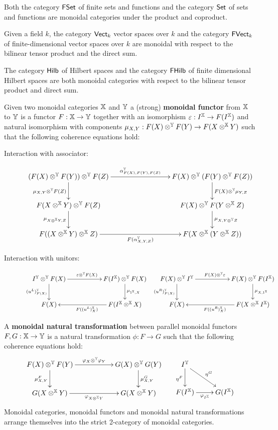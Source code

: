 \begin{example}
Both the category $\mathsf{FSet}$ of finite sets and functions and the category $\mathsf{Set}$ of sets and functions are monoidal categories under the product and coproduct.

Given a field $k$, the category $\mathsf{Vect}_k$ vector spaces over $k$  and the category $\mathsf{FVect}_k$ of finite-dimensional vector spaces over $k$ are monoidal with respect to the bilinear tensor product and the direct sum.

The category $\mathsf{Hilb}$ of Hilbert spaces and the category $\mathsf{FHilb}$ of finite dimensional Hilbert spaces are both monoidal categories with respect to the bilinear tensor product and direct sum.
\end{example}
\begin{definition}
Given two monoidal categories $\mathbb{X}$ and $\mathbb{Y}$ a (strong) {\bf monoidal functor} from $\mathbb{X}$ to $\mathbb{Y}$ is a functor $F:\mathbb{X}\to \mathbb{Y}$ together with an isomorphism $\varepsilon:I^{\mathbb{X}} \to F(I^{\mathbb{X}})$ and natural isomorphism with components $\mu_{X,Y}:F(X)\otimes^{\mathbb{Y}} F(Y) \to F(X \otimes^{\mathbb{X}} Y)$ such that the following coherence equations hold:
\begin{description}
\item[Interaction with associator:]
$$
\xymatrix{
 (F(X)\otimes^\Y F(Y))\otimes^\Y F(Z) \ar[rrr]^{\alpha_{F(X),F(Y),F(Z)}^{\Y}} \ar[d]_{\mu_{X,Y}\otimes^\Y F(Z)}
   &&& F(X) \otimes^\Y (F(Y)\otimes^\Y F(Z)) \ar[d]^{F(X)\otimes^\Y \mu_{Y,Z}}
 \\F(X\otimes^\X Y)\otimes^\Y F(Z) \ar[d]_{\mu_{X\otimes^\X Y,Z}}
   &&& F(X)\otimes^\Y F(Y\otimes^\X Z) \ar[d]^{\mu_{X,Y\otimes^\Y Z}}
 \\ F((X\otimes^\X Y) \otimes^\X Z) \ar[rrr]_{F(\alpha_{X,Y,Z}^\Y)}
   &&& F(X\otimes^\X (Y\otimes^\X Z))
}
$$
\item[Interaction with unitors:]
$$
\xymatrix{
 I^\Y \otimes^\Y F(X) \ar[rr]^{\epsilon \otimes^\Y F(X)} \ar[d]_{(u^L)^\Y_{F(X)}}
  &&  F(I^\X) \otimes^\Y F(X) \ar[d]^{\mu_{1^\X,X}}
\\F(X)
 & & F(I^\X\otimes^\X X) \ar[ll]^{F((u^L)^\X_{X} )}
} \hspace*{.2cm}
\xymatrix{
  F(X)  \otimes^\Y I^\Y \ar[rr]^{ F(X)  \otimes^\Y \epsilon} \ar[d]_{(u^R)^\Y_{F(X)}}
  && F(X) \otimes^\Y    F(I^\X)  \ar[d]^{\mu_{X,1^\X}}
\\F(X)
 & & F(X \otimes^\X I^\X ) \ar[ll]^{F((u^R)^\X_{X} )}
}
$$
\end{description}
A {\bf monoidal natural transformation} between parallel monoidal functors $F,G:\mathbb{X}\to \mathbb{Y}$ is a natural transformation $\phi:F\to G$ such that the following coherence equations hold:
$$
\xymatrix{
  F(X)\otimes^\Y F(Y) \ar[rr]^{\phi_X\otimes^\Y \phi_Y} \ar[d]_{\mu^F_{X,Y}}
   && G(X)\otimes^\Y G(Y) \ar[d]^{\mu^G_{X,Y}}
 \\G(X\otimes^\X Y) \ar[rr]_{\phi_{X\otimes^\X Y}}
   && G(X\otimes^\X Y)
}
\hspace*{.5cm}
\xymatrix{
I^\Y \ar[dr]^{\eta^G} \ar[d]_{\eta^F}
\\ F(I^\X) \ar[r]_{\phi_{I^\X}}
  &G(I^\X)
}
$$
Monoidal categories, monoidal functors and monoidal natural transformations arrange themselves into the strict 2-category of monoidal categories. 
\end{definition}
